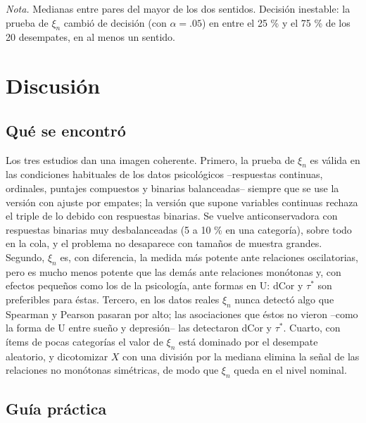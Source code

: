 \documentclass[man,donotrepeattitle,floatsintext]{apa7}
\begin{document}
\begin{table}
\caption{Variabilidad de $\xi_n$ entre desempates aleatorios en los datos reales}
\label{tab:s3tb}
\begin{threeparttable}
\small

\begin{tablenotes}[flushleft]
\small
\item \textit{Nota.} Medianas entre pares del mayor de los dos sentidos. Decisión inestable: la prueba de $\xi_n$ cambió de decisión (con $\alpha=.05$) en entre el 25 \% y el 75 \% de los 20 desempates, en al menos un sentido.
\end{tablenotes}
\end{threeparttable}
\end{table}

\section{Discusión}

\subsection{Qué se encontró}

Los tres estudios dan una imagen coherente. Primero, la prueba de $\xi_n$ es válida en las condiciones habituales de los datos psicológicos --respuestas continuas, ordinales, puntajes compuestos y binarias balanceadas-- siempre que se use la versión con ajuste por empates; la versión que supone variables continuas rechaza el triple de lo debido con respuestas binarias. Se vuelve anticonservadora con respuestas binarias muy desbalanceadas (5 a 10 \% en una categoría), sobre todo en la cola, y el problema no desaparece con tamaños de muestra grandes. Segundo, $\xi_n$ es, con diferencia, la medida más potente ante relaciones oscilatorias, pero es mucho menos potente que las demás ante relaciones monótonas y, con efectos pequeños como los de la psicología, ante formas en U: dCor y $\tau^*$ son preferibles para éstas. Tercero, en los datos reales $\xi_n$ nunca detectó algo que Spearman y Pearson pasaran por alto; las asociaciones que éstos no vieron --como la forma de U entre sueño y depresión-- las detectaron dCor y $\tau^*$. Cuarto, con ítems de pocas categorías el valor de $\xi_n$ está dominado por el desempate aleatorio, y dicotomizar $X$ con una división por la mediana elimina la señal de las relaciones no monótonas simétricas, de modo que $\xi_n$ queda en el nivel nominal.

\subsection{Guía práctica}
\end{document}
